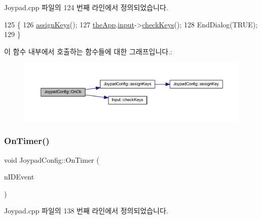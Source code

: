 Joypad.\+cpp 파일의 124 번째 라인에서 정의되었습니다.


\begin{DoxyCode}
125 \{
126   \mbox{\hyperlink{class_joypad_config_a37ced249f71ab247733787e07085e295}{assignKeys}}();
127   \mbox{\hyperlink{_v_b_a_8cpp_a8095a9d06b37a7efe3723f3218ad8fb3}{theApp}}.\mbox{\hyperlink{class_v_b_a_aaab971cb5d67a69e1a26502d15a4dc60}{input}}->\mbox{\hyperlink{class_input_a91418a5762e6e50aa4f59e4ce92d2dfa}{checkKeys}}();
128   EndDialog(TRUE);
129 \}
\end{DoxyCode}
이 함수 내부에서 호출하는 함수들에 대한 그래프입니다.\+:
\nopagebreak
\begin{figure}[H]
\begin{center}
\leavevmode
\includegraphics[width=350pt]{class_joypad_config_a80b628b0368a606e47d6ecd2d1e76624_cgraph}
\end{center}
\end{figure}
\mbox{\label{class_joypad_config_af55cd03e7ed293d17d338858285a8087}} 
\subsubsection{\texorpdfstring{On\+Timer()}{OnTimer()}}
{\footnotesize\ttfamily void Joypad\+Config\+::\+On\+Timer (\begin{DoxyParamCaption}\item[{U\+I\+N\+T\+\_\+\+P\+TR}]{n\+I\+D\+Event }\end{DoxyParamCaption})\hspace{0.3cm}{\ttfamily [protected]}}



Joypad.\+cpp 파일의 138 번째 라인에서 정의되었습니다.


